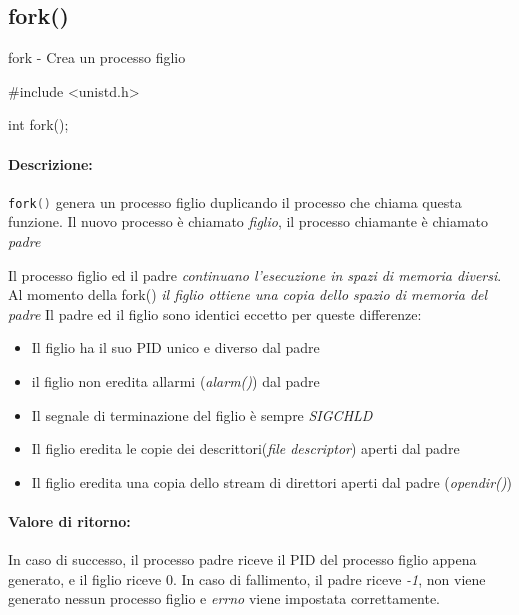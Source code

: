\documentclass
[10pt,        %
 a4paper,     %
 onecolumn,   %
 fleqn,       %
 oneside,     %
 notitlepage, %
]{article}    %
\begin{document}
\subsection{fork()}
fork - Crea un processo figlio
\begin{C}
    #include <unistd.h>

    int fork();
\end{C}
\paragraph{Descrizione:}
\lstinline[language=C]!fork()! genera un processo figlio duplicando il processo che chiama questa funzione.
Il nuovo processo è chiamato \textit{figlio}, il processo chiamante è chiamato \textit{padre}

Il processo figlio ed il padre \textit{continuano l'esecuzione in spazi di memoria diversi}. Al momento della fork() \textit{il figlio ottiene una copia dello spazio di memoria del padre}
Il padre ed il figlio sono identici eccetto per queste differenze:
\begin{itemize}
    \item Il figlio ha il suo PID unico e diverso dal padre
    \item il figlio non eredita allarmi (\textit{alarm()}) dal padre
    \item Il segnale di terminazione del figlio è sempre \textit{SIGCHLD}
    \item Il figlio eredita le copie dei descrittori(\textit{file descriptor}) aperti dal padre
    \item Il figlio eredita una copia dello stream di direttori aperti dal padre (\textit{opendir()})
\end{itemize}
\paragraph{Valore di ritorno:}
In caso di successo, il processo padre riceve il PID del processo figlio appena generato, e il figlio riceve 0. 
In caso di fallimento, il padre riceve \textit{-1}, non viene generato nessun processo figlio e \textit{errno} viene impostata correttamente.
\end{document}
